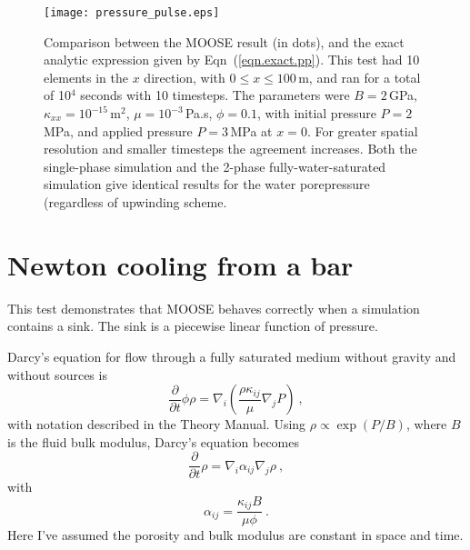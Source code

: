 \documentclass[]{scrreprt}
\begin{document}
\begin{figure}[htb]
\centering
\texttt{[image: pressure\_pulse.eps]}
\caption{Comparison between the MOOSE result (in dots), and the
  exact analytic expression given by Eqn~(\ref{eqn.exact.pp}).  This
  test had 10 elements in the $x$ direction, with $0\leq x \leq
  100$\,m, and ran for a total of
  10$^4$ seconds with 10 timesteps.  The parameters were $B=2$\,GPa,
  $\kappa_{xx}=10^{-15}$\,m$^{2}$, $\mu=10^{-3}$\,Pa.s, $\phi=0.1$,
  with initial pressure $P=2$\,MPa, and applied pressure $P=3$\,MPa at
  $x=0$.  For greater spatial resolution and smaller timesteps the
  agreement increases.  Both the single-phase simulation and the
  2-phase fully-water-saturated simulation give identical results for
  the water porepressure (regardless of upwinding scheme.}
\label{pressure_pulse.fig}
\end{figure}



\chapter{Newton cooling from a bar}
\label{nc}

This test demonstrates that MOOSE behaves correctly when a simulation
contains a sink.  The sink is a piecewise linear function of pressure.

Darcy's equation for flow through a fully saturated medium without
gravity and without sources is
\begin{equation}
\frac{\partial}{\partial t}\phi\rho = \nabla_{i}\left(\frac{\rho
  \kappa_{ij}}{\mu} \nabla_{j}P \right) \ ,
\end{equation}
with notation described in the Theory Manual.  Using $\rho \propto
\exp(P/B)$, where $B$ is the fluid bulk modulus, Darcy's equation
becomes
\begin{equation}
\frac{\partial}{\partial t}\rho = \nabla_{i}\alpha_{ij}\nabla_{j}\rho \ ,
\end{equation}
with
\begin{equation}
\alpha_{ij} = \frac{\kappa_{ij}B}{\mu\phi} \ .
\end{equation}
Here I've assumed the porosity and bulk modulus are constant in space
and time.
\end{document}
